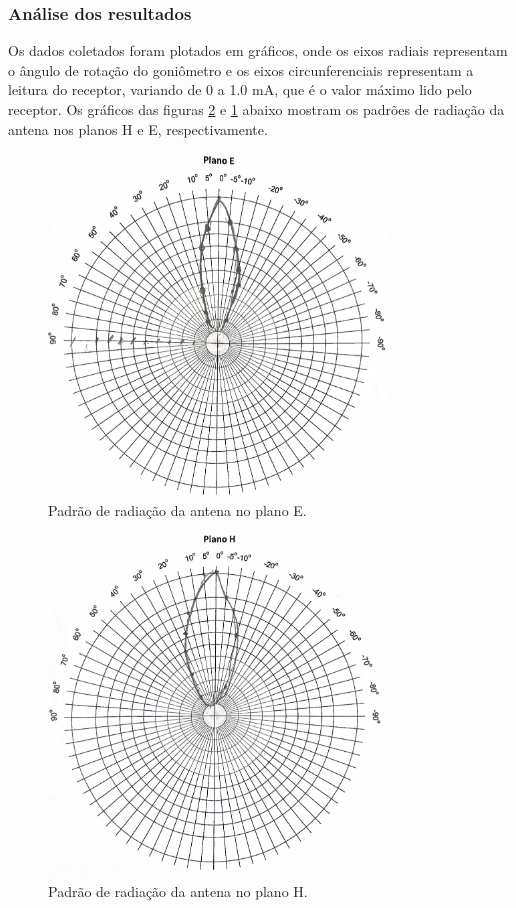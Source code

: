 \documentclass[12pt]{article}
\begin{document}
\subsubsection{Análise dos resultados}

Os dados coletados foram plotados em gráficos, onde os eixos radiais
representam o ângulo de rotação do goniômetro e os eixos circunferenciais
representam a leitura do receptor, variando de 0 a 1.0 mA, que é o
valor máximo lido pelo receptor. Os gráficos das figuras
\ref{fig:img/planoh.png}
e \ref{fig:img/planoe.png} abaixo mostram os padrões de radiação da
antena nos planos H e E, respectivamente.

\begin{figure}[H]
  \centering
  \includegraphics[width=0.8\textwidth]{img/planoe.png}
  \caption{Padrão de radiação da antena no plano E.}
  \label{fig:img/planoe.png}
\end{figure}

\begin{figure}[H]
  \centering
  \includegraphics[width=0.8\textwidth]{img/planoh.png}
  \caption{Padrão de radiação da antena no plano H.}
  \label{fig:img/planoh.png}
\end{figure}
\end{document}
